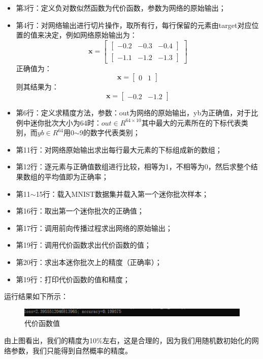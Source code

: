 \documentclass[UTF8]{article}
\begin{document}
\begin{itemize}
\item 第3行：定义负对数似然函数为代价函数，参数为网络的原始输出；
\item 第4行：对网络输出进行切片操作，取所有行，每行保留的元素由target对应位置的值来决定，例如网络原始输出为：
\begin{equation}
\boldsymbol{x} = \begin{bmatrix}
\begin{bmatrix}
-0.2 & -0.3 & -0.4 
\end{bmatrix} \\
\begin{bmatrix}
-1.1 & -1.2 & -1.3
\end{bmatrix}
\end{bmatrix}
\label{mlp-e3-input-loss-output}
\end{equation}
正确值为：
\begin{equation}
\boldsymbol{x} = \begin{bmatrix}
0 & 1
\end{bmatrix}
\label{mlp-e3-input-loss-target}
\end{equation}
则其结果为：
\begin{equation}
\boldsymbol{x} = \begin{bmatrix}
-0.2 & -1.2
\end{bmatrix}
\label{mlp-e3-input-loss-result}
\end{equation}
\item 第6行：定义求精度方法，参数：out为网络的原始输出，yb为正确值，对于比例中迷你批次大小为64时：$out \in R^{64 \times 10}$其中最大的元素所在的下标代表类别，而$yb \in R^{64}$用0$\sim$9的数字代表类别；
\item 第11行：对网络原始输出求出每行最大元素的下标组成新的数组；
\item 第12行：逐元素与正确值数组进行比较，相等为1，不相等为0，然后求整个结果数组的平均值即为正确率；
\item 第11$\sim$15行：载入MNIST数据集并载入第一个迷你批次样本；
\item 第16行：取出第一个迷你批次的正确值；
\item 第17行：调用前向传播过程求出网络的原始输出；
\item 第19行：调用代价函数求出代价函数的值；
\item 第20行：求出本迷你批次上的精度（正确率）；
\item 第19行：打印代价函数的值和精度；
\end{itemize}
运行结果如下所示：
\begin{figure}[H]
	\caption{代价函数值}
	\label{f000082}
	\centering
	\includegraphics[width=15cm]{images/f000082}
\end{figure}
由上图看出，我们的精度为10\%左右，这是合理的，因为我们用随机数初始化的网络参数，我们只能得到自然概率的精度。
\end{document}
